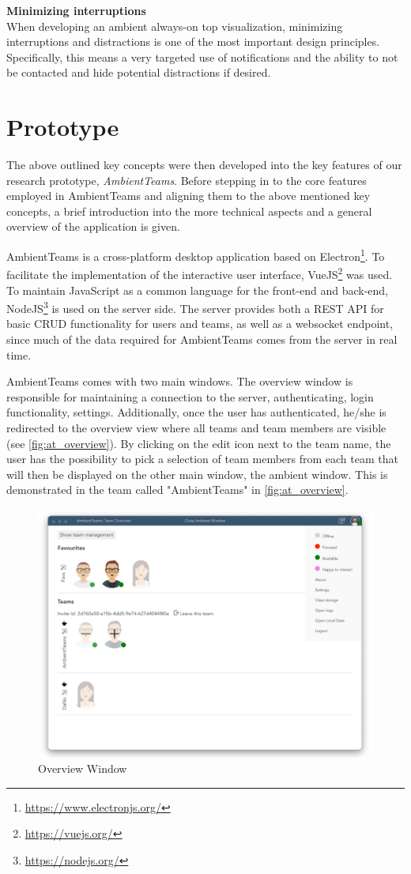 \medskip\noindent\textbf{Minimizing interruptions} \\
When developing an ambient always-on top visualization, minimizing interruptions and distractions is one of the most important design principles. Specifically, this means a very targeted use of notifications and the ability to not be contacted and hide potential distractions if desired.

\section{Prototype}
The above outlined key concepts were then developed into the key features of our research prototype, \textit{AmbientTeams}. Before stepping in to the core features employed in AmbientTeams and aligning them to the above mentioned key concepts, a brief introduction into the more technical aspects and a general overview of the application is given.

AmbientTeams is a cross-platform desktop application based on Electron\footnote{\url{https://www.electronjs.org/}}. To facilitate the implementation of the interactive user interface, VueJS\footnote{\url{https://vuejs.org/}} was used. To maintain JavaScript as a common language for the front-end and back-end, NodeJS\footnote{\url{https://nodejs.org/}} is used on the server side. The server provides both a REST API for basic CRUD functionality for users and teams, as well as a websocket endpoint, since much of the data required for AmbientTeams comes from the server in real time.

AmbientTeams comes with two main windows. The overview window is responsible for maintaining a connection to the server, authenticating, login functionality, settings. Additionally, once the user has authenticated, he/she is redirected to the overview view where all teams and team members are visible (see \autoref{fig:at_overview}). By clicking on the edit icon next to the team name, the user has the possibility to pick a selection of team members from each team that will then be displayed on the other main window, the ambient window. This is demonstrated in the team called "AmbientTeams" in \autoref{fig:at_overview}.

\begin{figure}[h]
    \centering
    \includegraphics[width=.8\linewidth]{./images/AT_overview.png}
    \caption{Overview Window }
    \label{fig:at_overview}
\end{figure}

